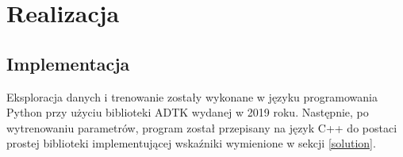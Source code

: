 \documentclass[12pt]{article}
\begin{document}
    \section{Realizacja}

    \subsection{Implementacja}
    Eksploracja danych i trenowanie zostały wykonane w języku programowania Python przy użyciu biblioteki ADTK
    \cite{ADTK} wydanej w 2019 roku. Następnie, po wytrenowaniu parametrów, program został przepisany na język C++ do
    postaci prostej biblioteki implementującej wskaźniki wymienione w sekcji \ref{solution}.
    \printbibliography
\end{document}
